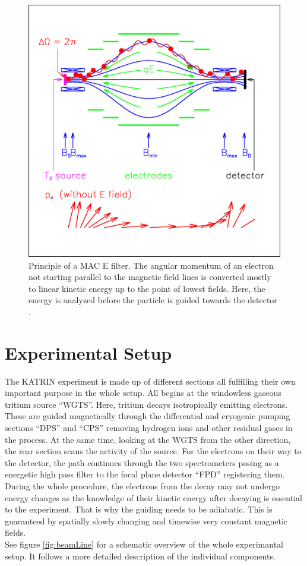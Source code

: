             \begin{figure}
	\centering
      	\includegraphics[width = 0.6 \textwidth]{graphics/katrinExperiment/macEFilter.jpg}
      	\caption[MAC E Filter]{Principle of a MAC E filter. The angular momentum of an electron not starting parallel to the magnetic field lines is converted mostly to linear kinetic energy up to the point of lowest fields. Here, the energy is analyzed before the particle is guided towards the detector \cite{macEFilter}.}
      	\label{fig:katrinExperiment:macEFilter}
      \end{figure}
      

      \section{Experimental Setup}
      \label{ch:The KATRIN experiment:sec:Experimental setup}
      The KATRIN experiment is made up of different sections all fulfilling their own important purpose in the whole setup. All begins at the windowless gaseous tritium source ``WGTS''. Here, tritium decays isotropically emitting electrons. These are guided magnetically through the differential and cryogenic pumping sections ``DPS'' and ``CPS'' removing hydrogen ions and other residual gases in the process. At the same time, looking at the WGTS from the other direction, the rear section scans the activity of the source. For the electrons on their way to the detector, the path continues through the two spectrometers posing as a energetic high pass filter to the focal plane detector ``FPD'' registering them.\\
      During the whole procedure, the electrons from the decay may not undergo energy changes as the knowledge of their kinetic energy after decaying is essential to the experiment. That is why the guiding needs to be adiabatic. This is guaranteed by spatially slowly changing and timewise very constant magnetic fields.\\
      See figure \ref{fig:beamLine} for a schematic overview of the whole experimantal setup. It follows a more detailed description of the individual components.
      

